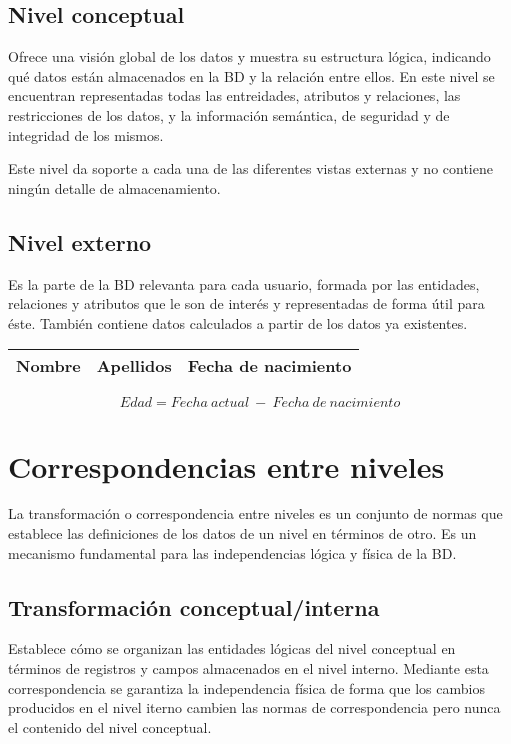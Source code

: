 \subsection{Nivel conceptual}

Ofrece una visión global de los datos y muestra su estructura lógica, indicando qué datos están almacenados en la BD y la relación entre ellos.
En este nivel se encuentran representadas todas las entreidades, atributos y relaciones, las restricciones de los datos, y la información semántica, de seguridad y de integridad de los mismos.

Este nivel da soporte a cada una de las diferentes vistas externas y no contiene ningún detalle de almacenamiento.

\subsection{Nivel externo}

Es la parte de la BD relevanta para cada usuario, formada por las entidades, relaciones y atributos que le son de interés y representadas de forma útil para éste.
También contiene datos calculados a partir de los datos ya existentes.

\begin{center}
\begin{tabular}{| l | l | l |}
\hline
Nombre & Apellidos & Fecha de nacimiento \\
\hline
\end{tabular}
\[Edad=Fecha\ actual\ -\ Fecha\ de\ nacimiento\]
\end{center}

\section{Correspondencias entre niveles}

La transformación o correspondencia entre niveles es un conjunto de normas que establece las definiciones de los datos de un nivel en términos de otro.
Es un mecanismo fundamental para las independencias lógica y física de la BD\@.

\subsection{Transformación conceptual/interna}

Establece cómo se organizan las entidades lógicas del nivel conceptual en términos de registros y campos almacenados en el nivel interno.
Mediante esta correspondencia se garantiza la independencia física de forma que los cambios producidos en el nivel iterno cambien las normas de correspondencia pero nunca el contenido del nivel conceptual.

